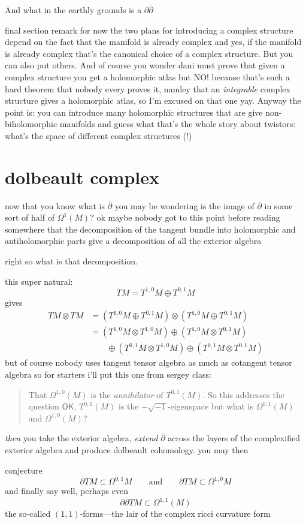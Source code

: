And what in the earthly grounds is a \(\partial\bar\partial\)

\begin{thing6}{final section remark for now}\leavevmode
the two plans for introducing a complex structure depend on the fact that the manifold is already complex and yes, if the manifold is already complex that's the canonical choice of a complex structure. But you can also put others. And of course you wonder dani must prove that given a complex structure you get a holomorphic atlas but NO! because that's such a hard theorem that nobody every proves it, namley that an \textit{integrable} complex structure gives a holomorphic atlas, so I'm excused on that one yay. Anyway the point is: you can introduce many holomorphic structures that are give non-biholomorphic manifolds and guess what that's the whole story about twistors: what's the space of different complex structures (!)
\end{thing6}

\section{dolbeault complex}
now that you know what is \(\bar\partial\) you may be wondering is the image of \(\overline{\partial}\) in some sort of half of \(\Omega^1(M)\)? ok maybe nobody got to this point before reading somewhere that the decomposition of the tangent bundle into holomorphic and antiholomorphic parts give a decomposition of all the exterior algebra

right so what is that decomposition.

this super natural:
\[TM=T^{1,0}M \oplus T^{0,1}M\]
gives
\begin{align*}TM \otimes TM&=(T^{1,0}M \oplus T^{0,1}M) \otimes(T^{1,0}M \oplus T^{0,1}M)\\
&=(T^{1,0}M \otimes T^{1,0}M) \oplus (T^{1,0}M\otimes T^{0,1}M)\\&\qquad \oplus (T^{0,1}M \otimes T^{1,0}M) \oplus  (T^{0,1}M \otimes T^{0,1}M)
\end{align*}
but of course nobody uses tangent tensor algebra as much as cotangent tensor algebra so for starters i'll put this one from sergey class:

\begin{quotation}
That \(\Omega^{1,0}(M)\) is the \textit{annihilator} of \(T^{0,1}(M)\). So this addresses the question $\mathsf{OK}$, \(T^{0,1}(M)\) is the \(- \sqrt{-1}\)-eigenspace but what is \(\Omega^{0,1}(M)\) and \(\Omega^{1,0}(M)\)?
\end{quotation}
\textit{then} you take the exterior algebra, \textit{extend} \(\overline{\partial}\) across the layers of the complexified exterior algebra and produce dolbeault cohomology. you may then
\begin{thing6}{conjecture}\leavevmode
	\[\overline{\partial}TM \subset \Omega^{0,1}M \qquad \text{and}\qquad  \partial TM \subset \Omega^{1,0}M\]
and finally say well, perhaps even
\[\partial\overline{\partial}TM \subset \Omega^{1,1}(M)\]
the so-called \((1,1)\)-forms---the lair of the complex ricci curvature form
\end{thing6}
